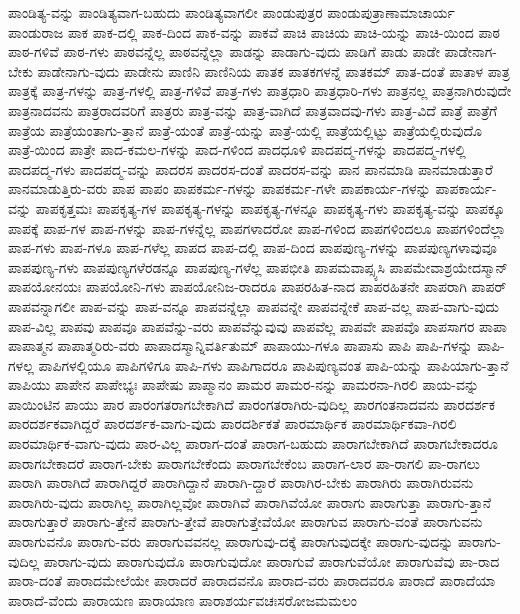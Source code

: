 {ಪಾಂಡಿತ್ಯ-ವನ್ನು
ಪಾಂಡಿತ್ಯವಾಗ-ಬಹುದು
ಪಾಂಡಿತ್ಯವಾಗಲೀ
ಪಾಂಡುಪುತ್ರರ
ಪಾಂಡುಪುತ್ರಾಣಾಮಾಚಾರ್ಯ
ಪಾಂಡುರಾಜ
ಪಾಕ
ಪಾಕ-ದಲ್ಲಿ
ಪಾಕ-ದಿಂದ
ಪಾಕ-ವನ್ನು
ಪಾಕವೆ
ಪಾಚಿ
ಪಾಚಿಯ
ಪಾಚಿ-ಯನ್ನು
ಪಾಚಿ-ಯಿಂದ
ಪಾಠ
ಪಾಠ-ಗಳಿವೆ
ಪಾಠ-ಗಳು
ಪಾಠವನ್ನೆಲ್ಲ
ಪಾಠವನ್ನೆಲ್ಲಾ
ಪಾಡನ್ನು
ಪಾಡಾಗು-ವುದು
ಪಾಡಿಗೆ
ಪಾಡು
ಪಾಡೇ
ಪಾಡೇನಾಗ-ಬೇಕು
ಪಾಡೇನಾಗು-ವುದು
ಪಾಡೇನು
ಪಾಣಿನಿ
ಪಾಣಿನಿಯ
ಪಾತಕ
ಪಾತಕಗಳನ್ನೆ
ಪಾತಕಮ್
ಪಾತ-ದಂತೆ
ಪಾತಾಳ
ಪಾತ್ರ
ಪಾತ್ರಕ್ಕೆ
ಪಾತ್ರ-ಗಳನ್ನು
ಪಾತ್ರ-ಗಳಲ್ಲಿ
ಪಾತ್ರ-ಗಳಿವೆ
ಪಾತ್ರ-ಗಳು
ಪಾತ್ರಧಾರಿ
ಪಾತ್ರಧಾರಿ-ಗಳು
ಪಾತ್ರನಲ್ಲ
ಪಾತ್ರನಾಗಿರುವುದೇ
ಪಾತ್ರನಾದವನು
ಪಾತ್ರರಾದವರಿಗೆ
ಪಾತ್ರರು
ಪಾತ್ರ-ವನ್ನು
ಪಾತ್ರ-ವಾಗಿದೆ
ಪಾತ್ರವಾದವು-ಗಳು
ಪಾತ್ರ-ವಿದೆ
ಪಾತ್ರೆ
ಪಾತ್ರೆಗೆ
ಪಾತ್ರೆಯ
ಪಾತ್ರೆಯಂತಾಗು-ತ್ತಾನೆ
ಪಾತ್ರೆ-ಯಂತೆ
ಪಾತ್ರೆ-ಯನ್ನು
ಪಾತ್ರೆ-ಯಲ್ಲಿ
ಪಾತ್ರೆಯಲ್ಲಿಟ್ಟು
ಪಾತ್ರೆಯಲ್ಲಿರುವುದೊ
ಪಾತ್ರೆ-ಯಿಂದ
ಪಾತ್ರೇ
ಪಾದ-ಕಮಲ-ಗಳನ್ನು
ಪಾದ-ಗಳಿಂದ
ಪಾದಧೂಳಿ
ಪಾದಪದ್ಮ-ಗಳನ್ನು
ಪಾದಪದ್ಮ-ಗಳಲ್ಲಿ
ಪಾದಪದ್ಮ-ಗಳು
ಪಾದಪದ್ಮ-ವನ್ನು
ಪಾದರಸ
ಪಾದರಸ-ದಂತೆ
ಪಾದರಸ-ವನ್ನು
ಪಾನ
ಪಾನಮಾಡಿ
ಪಾನಮಾಡುತ್ತಾರೆ
ಪಾನಮಾಡುತ್ತಿರು-ವರು
ಪಾಪ
ಪಾಪಂ
ಪಾಪಕರ್ಮ-ಗಳನ್ನು
ಪಾಪಕರ್ಮ-ಗಳೇ
ಪಾಪಕಾರ್ಯ-ಗಳನ್ನು
ಪಾಪಕಾರ್ಯ-ವನ್ನು
ಪಾಪಕೃತ್ತಮಃ
ಪಾಪಕೃತ್ಯ-ಗಳ
ಪಾಪಕೃತ್ಯ-ಗಳನ್ನು
ಪಾಪಕೃತ್ಯ-ಗಳನ್ನೂ
ಪಾಪಕೃತ್ಯ-ಗಳು
ಪಾಪಕೃತ್ಯ-ವನ್ನು
ಪಾಪಕ್ಕೂ
ಪಾಪಕ್ಕೆ
ಪಾಪ-ಗಳ
ಪಾಪ-ಗಳನ್ನು
ಪಾಪ-ಗಳನ್ನೆಲ್ಲ
ಪಾಪಗಳಾದರೋ
ಪಾಪ-ಗಳಿಂದ
ಪಾಪಗಳಿಂದಲೂ
ಪಾಪಗಳಿಂದೆಲ್ಲಾ
ಪಾಪ-ಗಳು
ಪಾಪ-ಗಳೂ
ಪಾಪ-ಗಳೆಲ್ಲ
ಪಾಪದ
ಪಾಪ-ದಲ್ಲಿ
ಪಾಪ-ದಿಂದ
ಪಾಪಪುಣ್ಯ-ಗಳನ್ನು
ಪಾಪಪುಣ್ಯಗಳಾವುವೂ
ಪಾಪಪುಣ್ಯ-ಗಳು
ಪಾಪಪುಣ್ಯಗಳೆರಡನ್ನೂ
ಪಾಪಪುಣ್ಯ-ಗಳೆಲ್ಲ
ಪಾಪಭೀತಿ
ಪಾಪಮವಾಪ್ಸ್ಯಸಿ
ಪಾಪಮೇವಾಶ್ರಯೇದಸ್ಮಾನ್
ಪಾಪಯೋನಯಃ
ಪಾಪಯೋನಿ-ಗಳು
ಪಾಪಯೋನಿಜ-ರಾದರೂ
ಪಾಪರಹಿತ-ನಾದ
ಪಾಪರಹಿತನೇ
ಪಾಪರಾಗಿ
ಪಾಪರ್
ಪಾಪವನ್ನಾಗಲೀ
ಪಾಪ-ವನ್ನು
ಪಾಪ-ವನ್ನೂ
ಪಾಪವನ್ನೆಲ್ಲಾ
ಪಾಪವನ್ನೇ
ಪಾಪವನ್ನೇಕೆ
ಪಾಪ-ವಲ್ಲ
ಪಾಪ-ವಾಗು-ವುದು
ಪಾಪ-ವಿಲ್ಲ
ಪಾಪವು
ಪಾಪವೂ
ಪಾಪವೆನ್ನು-ವರು
ಪಾಪವೆನ್ನುವುವು
ಪಾಪವೆಲ್ಲ
ಪಾಪವೇ
ಪಾಪವೊ
ಪಾಪಸಾಗರ
ಪಾಪಾ
ಪಾಪಾತ್ಮನ
ಪಾಪಾತ್ಮರಿರು-ವರು
ಪಾಪಾದಸ್ಮಾನ್ನಿವರ್ತಿತುಮ್
ಪಾಪಾಯು-ಗಳೂ
ಪಾಪಾಸು
ಪಾಪಿ
ಪಾಪಿ-ಗಳನ್ನು
ಪಾಪಿ-ಗಳಲ್ಲ
ಪಾಪಿಗಳಲ್ಲಿಯೂ
ಪಾಪಿಗಳಿಗೂ
ಪಾಪಿ-ಗಳು
ಪಾಪಿಗಾದರೂ
ಪಾಪಿಪುಣ್ಯವಂತ
ಪಾಪಿ-ಯನ್ನು
ಪಾಪಿಯಾಗು-ತ್ತಾನೆ
ಪಾಪಿಯು
ಪಾಪೇನ
ಪಾಪೇಭ್ಯಃ
ಪಾಪೇಷು
ಪಾಪ್ಮಾನಂ
ಪಾಮರ
ಪಾಮರ-ನನ್ನು
ಪಾಮರನಾ-ಗಿರಲಿ
ಪಾಯ-ವನ್ನು
ಪಾಯಿಂಟಿನ
ಪಾಯು
ಪಾರ
ಪಾರಂಗತರಾಗಬೇಕಾಗಿದೆ
ಪಾರಂಗತರಾಗಿರು-ವುದಿಲ್ಲ
ಪಾರಗಂತನಾದವನು
ಪಾರದರ್ಶಕ
ಪಾರದರ್ಶಕವಾಗಿದ್ದರೆ
ಪಾರದರ್ಶಕ-ವಾಗು-ವುದು
ಪಾರದರ್ಶಿಕತೆ
ಪಾರಮಾರ್ಥಿಕ
ಪಾರಮಾರ್ಥಿಕವಾ-ಗಿರಲಿ
ಪಾರಮಾರ್ಥಿಕ-ವಾಗು-ವುದು
ಪಾರ-ವಿಲ್ಲ
ಪಾರಾಗ-ದಂತೆ
ಪಾರಾಗ-ಬಹುದು
ಪಾರಾಗಬೇಕಾಗಿದೆ
ಪಾರಾಗಬೇಕಾದರೂ
ಪಾರಾಗಬೇಕಾದರೆ
ಪಾರಾಗ-ಬೇಕು
ಪಾರಾಗಬೇಕೆಂದು
ಪಾರಾಗಬೇಕೆಂಬ
ಪಾರಾಗ-ಲಾರ
ಪಾ-ರಾಗಲಿ
ಪಾ-ರಾಗಲು
ಪಾರಾಗಿ
ಪಾರಾಗಿದೆ
ಪಾರಾಗಿದ್ದರೆ
ಪಾರಾಗಿದ್ದಾನೆ
ಪಾರಾಗಿ-ದ್ದಾರೆ
ಪಾರಾಗಿರ-ಬೇಕು
ಪಾರಾಗಿರು
ಪಾರಾಗಿರುವನು
ಪಾರಾಗಿರು-ವುದು
ಪಾರಾಗಿಲ್ಲ
ಪಾರಾಗಿಲ್ಲವೋ
ಪಾರಾಗಿವೆ
ಪಾರಾಗಿವೆಯೋ
ಪಾರಾಗು
ಪಾರಾಗುತ್ತಾ
ಪಾರಾಗು-ತ್ತಾನೆ
ಪಾರಾಗುತ್ತಾರೆ
ಪಾರಾಗು-ತ್ತೇನೆ
ಪಾರಾಗು-ತ್ತೇವೆ
ಪಾರಾಗುತ್ತೇವೆಯೋ
ಪಾರಾಗುವ
ಪಾರಾಗು-ವಂತೆ
ಪಾರಾಗುವನು
ಪಾರಾಗುವನೊ
ಪಾರಾಗು-ವರು
ಪಾರಾಗುವವನಲ್ಲ
ಪಾರಾಗುವು-ದಕ್ಕೆ
ಪಾರಾಗುವುದಕ್ಕೇ
ಪಾರಾಗು-ವುದನ್ನು
ಪಾರಾಗು-ವುದಿಲ್ಲ
ಪಾರಾಗು-ವುದು
ಪಾರಾಗುವುದೊ
ಪಾರಾಗುವುದೋ
ಪಾರಾಗುವೆ
ಪಾರಾಗುವೆಯೋ
ಪಾರಾಗುವೆವು
ಪಾ-ರಾದ
ಪಾರಾ-ದಂತೆ
ಪಾರಾದಮೇಲೆಯೇ
ಪಾರಾದರೆ
ಪಾರಾದವನೊ
ಪಾರಾದ-ವರು
ಪಾರಾದವರೂ
ಪಾರಾದೆ
ಪಾರಾದೆಯಾ
ಪಾರಾದೆ-ವೆಂದು
ಪಾರಾಯಣ
ಪಾರಾಯಾಣ
ಪಾರಾಶರ್ಯವಚಃಸರೋಜಮಮಲಂ
}
